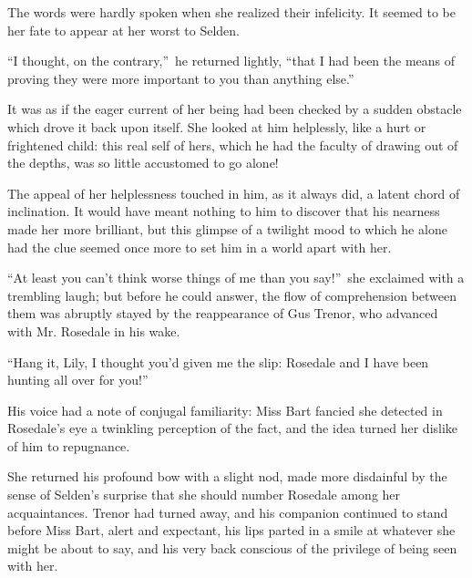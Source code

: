 \documentclass[12pt,a4paper]{book}
\begin{document}
The words were hardly spoken when she realized their infelicity. 
It seemed to be her fate to appear at her worst to Selden.





``I thought, on the contrary,''\ he returned lightly, ``that I had
been the means of proving they were more important to you than
anything else.''





It was as if the eager current of her being had been checked by a
sudden obstacle which drove it back upon itself. She looked at
him helplessly, like a hurt or frightened child: this real self
of hers, which he had the faculty of drawing out of the depths,
was so little accustomed to go alone!





The appeal of her helplessness touched in him, as it always did,
a latent chord of inclination. It would have meant nothing to him
to discover that his nearness made her more brilliant, but this
glimpse of a twilight mood to which he alone had the clue seemed
once more to set him in a world apart with her.





``At least you can't think worse things of me than you say!''\ she
exclaimed with a trembling laugh; but before he could
answer, the flow of comprehension between them was abruptly
stayed by the reappearance of Gus Trenor, who advanced with Mr.
Rosedale in his wake.





``Hang it, Lily, I thought you'd given me the slip: Rosedale and I
have been hunting all over for you!''





His voice had a note of conjugal familiarity: Miss Bart fancied
she detected in Rosedale's eye a twinkling perception of the
fact, and the idea turned her dislike of him to repugnance.





She returned his profound bow with a slight nod, made more
disdainful by the sense of Selden's surprise that she should
number Rosedale among her acquaintances. Trenor had turned away,
and his companion continued to stand before Miss Bart, alert and
expectant, his lips parted in a smile at whatever she might be
about to say, and his very back conscious of the privilege of
being seen with her.
\end{document}
